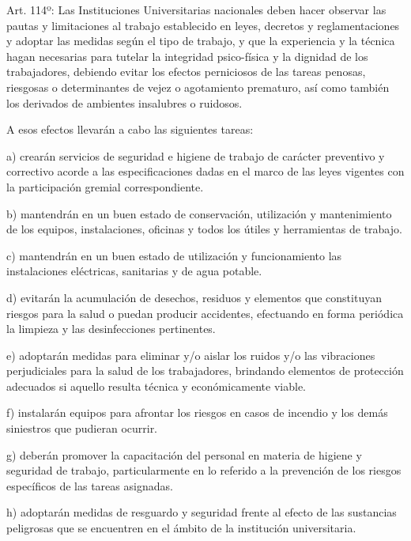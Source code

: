 \documentclass[]{article}
\begin{document}

Art. 114º: Las Instituciones Universitarias nacionales deben hacer
observar las pautas y limitaciones al trabajo establecido en leyes,
decretos y reglamentaciones y adoptar las medidas según el tipo de
trabajo, y que la experiencia y la técnica hagan necesarias para tutelar
la integridad psico-física y la dignidad de los trabajadores, debiendo
evitar los efectos perniciosos de las tareas penosas, riesgosas o
determinantes de vejez o agotamiento prematuro, así como también los
derivados de ambientes insalubres o ruidosos.

A esos efectos llevarán a cabo las siguientes tareas:

a) crearán servicios de seguridad e higiene de trabajo de carácter
preventivo y correctivo acorde a las especificaciones dadas en el marco
de las leyes vigentes con la participación gremial correspondiente.

b) mantendrán en un buen estado de conservación, utilización y
mantenimiento de los equipos, instalaciones, oficinas y todos los útiles
y herramientas de trabajo.

c) mantendrán en un buen estado de utilización y funcionamiento las
instalaciones eléctricas, sanitarias y de agua potable.

d) evitarán la acumulación de desechos, residuos y elementos que
constituyan riesgos para la salud o puedan producir accidentes,
efectuando en forma periódica la limpieza y las desinfecciones
pertinentes.

e) adoptarán medidas para eliminar y/o aislar los ruidos y/o las
vibraciones perjudiciales para la salud de los trabajadores, brindando
elementos de protección adecuados si aquello resulta técnica y
económicamente viable.

f) instalarán equipos para afrontar los riesgos en casos de incendio y
los demás siniestros que pudieran ocurrir.

g) deberán promover la capacitación del personal en materia de higiene y
seguridad de trabajo, particularmente en lo referido a la prevención de
los riesgos específicos de las tareas asignadas.

h) adoptarán medidas de resguardo y seguridad frente al efecto de las
sustancias peligrosas que se encuentren en el ámbito de la institución
universitaria.
\end{document}
